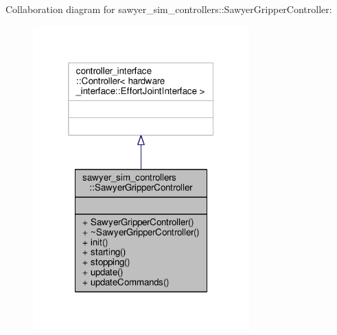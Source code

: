 Collaboration diagram for sawyer\-\_\-sim\-\_\-controllers\-:\-:Sawyer\-Gripper\-Controller\-:
\nopagebreak
\begin{figure}[H]
\begin{center}
\leavevmode
\includegraphics[width=236pt]{classsawyer__sim__controllers_1_1_sawyer_gripper_controller__coll__graph}
\end{center}
\end{figure}
